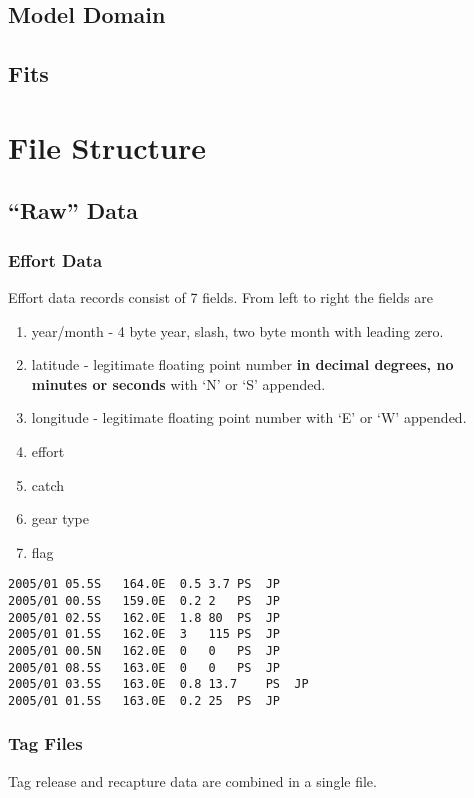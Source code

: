 \subsection*{Model Domain}
\subsection*{Fits}

\section*{File Structure}
\subsection*{``Raw'' Data}
\subsubsection*{Effort Data}
Effort data records consist of 7 fields.
From left to right the fields are
\begin{enumerate}
\item year/month - 4 byte year, slash, two byte month with leading
zero.
\item latitude - legitimate floating point number {\bf in decimal
degrees, no minutes or seconds} with `N' or `S' appended.
\item longitude - legitimate floating point number  with `E' or `W'
appended.
\item effort
\item catch
\item gear type
\item flag 
\end{enumerate}
{\par{}\normalbaselineskip
\begin{verbatim}
2005/01	05.5S	164.0E	0.5	3.7	PS	JP
2005/01	00.5S	159.0E	0.2	2	PS	JP
2005/01	02.5S	162.0E	1.8	80	PS	JP
2005/01	01.5S	162.0E	3	115	PS	JP
2005/01	00.5N	162.0E	0	0	PS	JP
2005/01	08.5S	163.0E	0	0	PS	JP
2005/01	03.5S	163.0E	0.8	13.7	PS	JP
2005/01	01.5S	163.0E	0.2	25	PS	JP
\end{verbatim}
\par}

\subsubsection*{Tag Files}
Tag release and recapture data are combined in a single file.

